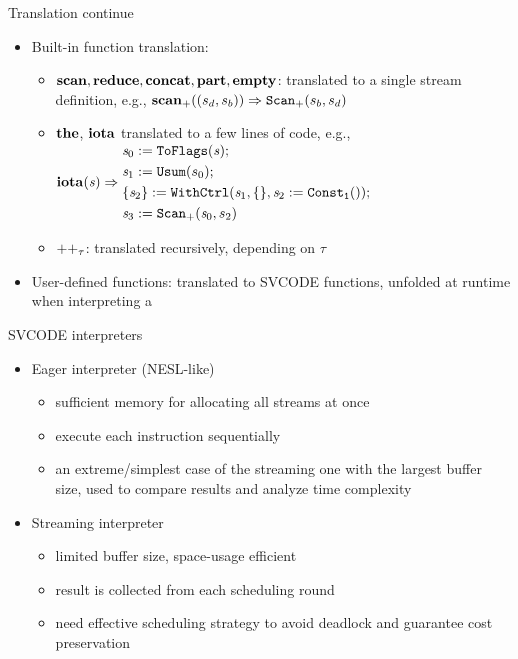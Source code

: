 \documentclass{beamer}
\begin{document}
\begin{frame}{Translation continue}
	\begin{itemize}
		 \item Built-in function translation: 
		\begin{itemize}
			\item $\*{scan}, \*{reduce}, \*{concat}, \*{part}, \*{empty}$: translated to a single stream definition, e.g., 
			${\*{scan}_+}{((s_d,s_b))} \Ra {\genscan_{+}(s_b,s_d)}$
			\item $\*{the}$, $\*{iota}$ translated to a few lines of code, e.g.,
			$\iota{\s} \Ra 
			 \begin{aligned}
			 & \sdef{\s_0}{\toflag(\s)} ; \\ 
			 & \sdef{\s_1}{\usum(s_0)} ; \\
			 & \withctrl{\s_1}{\sdef{\s_2}{\consta{1}()}}{\{\}}{\{\s_2\}}; \\
			 & \sdef{\s_3}{\genscan_{+}(\s_0,s_2)}
			 \end{aligned}$
			 
			\item $\*{++}_{\tau}$: translated recursively, depending on $\tau$

		\end{itemize}
		\item User-defined functions: translated to SVCODE functions, unfolded at runtime when interpreting a \sc 
	\end{itemize}
\end{frame}

\begin{frame}{SVCODE interpreters}
\begin{itemize}
	\item Eager interpreter (NESL-like) 
	\begin{itemize}
		\item sufficient memory for allocating all streams at once
		\item execute each instruction sequentially 
		\item an extreme/simplest case of the streaming one with the largest buffer size, used to compare results and analyze time complexity 
	\end{itemize}
	\item Streaming interpreter
	\begin{itemize}
		\item limited buffer size, space-usage efficient
		\item result is collected from  each scheduling round
		\item need effective scheduling strategy to avoid deadlock and guarantee cost preservation
	\end{itemize} 
	
\end{itemize}
\end{frame}
\end{document}

